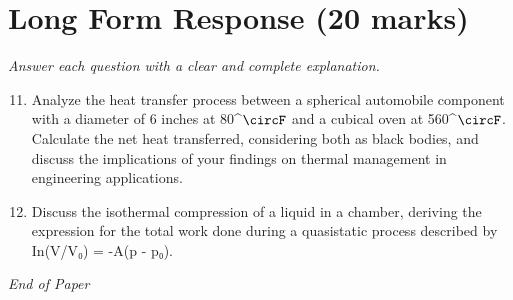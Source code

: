 \documentclass[12pt]{article}
\begin{document}
\section*{Long Form Response (20 marks)}
\textit{Answer each question with a clear and complete explanation.}
\begin{enumerate}[label=\arabic*.]
\setcounter{enumi}{10}
\item Analyze the heat transfer process between a spherical automobile component with a diameter of 6 inches at 80^\ensuremath{\circF} and a cubical oven at 560^\ensuremath{\circF}. Calculate the net heat transferred, considering both as black bodies, and discuss the implications of your findings on thermal management in engineering applications.
\item Discuss the isothermal compression of a liquid in a chamber, deriving the expression for the total work done during a quasistatic process described by In(V/V₀) = -A(p - p₀).
\end{enumerate}

\vfill
\noindent\textit{End of Paper}
\end{document}
